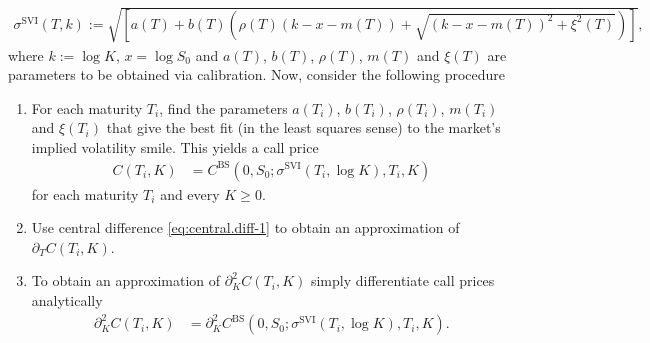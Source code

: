 \documentclass[12pt]{book}
\numberwithin{equation}{chapter}
\theoremstyle{plain}
\numberwithin{theorem}{section}
\theoremstyle{definition}
\numberwithin{exercise}{chapter}
\newcommand{\<}{\langle}
\renewcommand{\>}{\rangle}
\renewcommand{\(}{\left(}
\renewcommand{\)}{\right)}
\renewcommand{\[}{\left[}
\renewcommand{\]}{\right]}
\renewcommand\d{\partial}
\theoremstyle{definition}
\numberwithin{question}{section}
\begin{document}
\begin{align}
\sigma^\text{SVI} (T,k) 
	:= \sqrt{\[ a(T) + b(T) \( \rho(T) (k - x - m(T)) + \sqrt{(k-x-m(T))^2 + \xi^2(T)} \) \]},
\end{align}
where $k := \log K$, $x = \log S_0$ and  $a(T)$, $b(T)$, $\rho(T)$, $m(T)$ and $\xi(T)$ are parameters to be obtained via calibration.
Now, consider the following procedure
\begin{enumerate}
\item For each maturity $T_i$, find the parameters $a(T_i)$, $b(T_i)$, $\rho(T_i)$, $m(T_i)$ and $\xi(T_i)$ that give the best fit (in the least squares sense) to the market's implied volatility smile.  This yields a call price
\begin{align}
C(T_i,K)
	&=	C^\text{BS}(0,S_0;\sigma^\text{SVI}(T_i,\log K),T_i,K)
\end{align}
for each maturity $T_i$ and every $K \geq 0$.
\item Use central difference \eqref{eq:central.diff-1} to obtain an approximation of $\d_T C(T_i,K)$.
\item To obtain an approximation of $\d_K^2 C(T_i,K)$ simply differentiate call prices analytically
\begin{align}
\d_K^2 C(T_i,K) 
	&= \d_K^2 C^\text{BS}(0,S_0;\sigma^\text{SVI}(T_i,\log K),T_i,K).
\end{align}
\end{enumerate}
\end{document}
